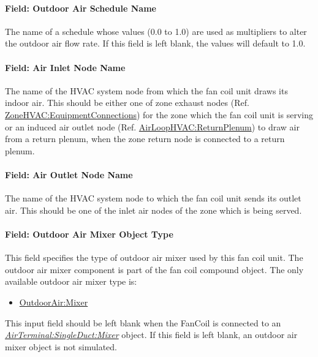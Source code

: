 \paragraph{Field: Outdoor Air Schedule Name}\label{field-outdoor-air-schedule-name-000}

The name of a schedule whose values (0.0 to 1.0) are used as multipliers to alter the outdoor air flow rate. If this field is left blank, the values will default to 1.0.

\paragraph{Field: Air Inlet Node Name}\label{field-air-inlet-node-name-009}

The name of the HVAC system node from which the fan coil unit draws its indoor air. This should be either one of zone exhaust nodes (Ref. \hyperref[zonehvacequipmentconnections]{ZoneHVAC:EquipmentConnections}) for the zone which the fan coil unit is serving or an induced air outlet node (Ref. \hyperref[airloophvacreturnplenum]{AirLoopHVAC:ReturnPlenum}) to draw air from a return plenum, when the zone return node is connected to a return plenum.

\paragraph{Field: Air Outlet Node Name}\label{field-air-outlet-node-name-008}

The name of the HVAC system node to which the fan coil unit sends its outlet air. This should be one of the inlet air nodes of the zone which is being served.

\paragraph{Field: Outdoor Air Mixer Object Type}\label{field-outdoor-air-mixer-object-type-000}

This field specifies the type of outdoor air mixer used by this fan coil unit. The outdoor air mixer component is part of the fan coil compound object. The only available outdoor air mixer type is:

\begin{itemize}
\tightlist
\item
  \hyperref[outdoorairmixer]{OutdoorAir:Mixer}
\end{itemize}

This input field should be left blank when the FanCoil is connected to an \textit{\hyperref[airterminalsingleductmixer]{AirTerminal:SingleDuct:Mixer}} object. If this field is left blank, an outdoor air mixer object is not simulated.

